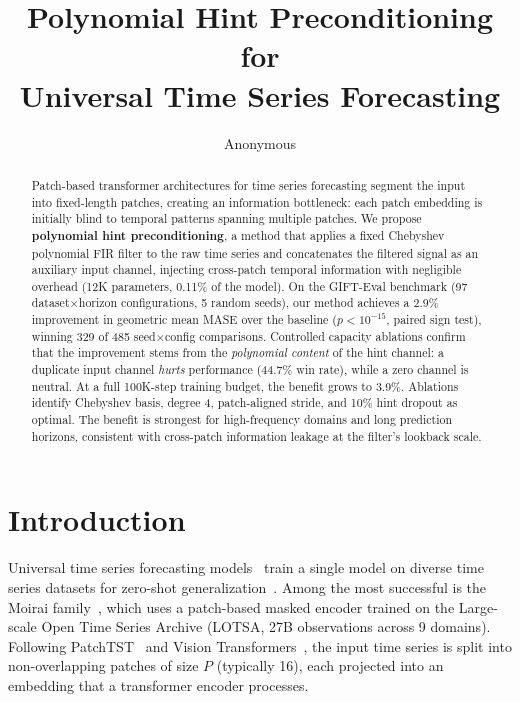 \documentclass{article}
\title{Polynomial Hint Preconditioning for\\Universal Time Series Forecasting}
\author{
  Anonymous
}
\begin{document}
\maketitle

\begin{abstract}
Patch-based transformer architectures for time series forecasting segment the input into fixed-length patches, creating an information bottleneck: each patch embedding is initially blind to temporal patterns spanning multiple patches. We propose \textbf{polynomial hint preconditioning}, a method that applies a fixed Chebyshev polynomial FIR filter to the raw time series and concatenates the filtered signal as an auxiliary input channel, injecting cross-patch temporal information with negligible overhead (12K parameters, 0.11\% of the model). On the GIFT-Eval benchmark (97 dataset$\times$horizon configurations, 5 random seeds), our method achieves a 2.9\% improvement in geometric mean MASE over the baseline ($p < 10^{-15}$, paired sign test), winning 329 of 485 seed$\times$config comparisons. Controlled capacity ablations confirm that the improvement stems from the \emph{polynomial content} of the hint channel: a duplicate input channel \emph{hurts} performance (44.7\% win rate), while a zero channel is neutral. At a full 100K-step training budget, the benefit grows to 3.9\%. Ablations identify Chebyshev basis, degree 4, patch-aligned stride, and 10\% hint dropout as optimal. The benefit is strongest for high-frequency domains and long prediction horizons, consistent with cross-patch information leakage at the filter's lookback scale.
\end{abstract}

\section{Introduction}

Universal time series forecasting models~\citep{woo2024unified,das2024decoder,ansari2024chronos,rasul2024lagllama,goswami2024moment,garza2024timegpt} train a single model on diverse time series datasets for zero-shot generalization~\citep{bommasani2021opportunities,liang2024foundation}. Among the most successful is the Moirai family~\citep{woo2024unified,liu2024moirai2}, which uses a patch-based masked encoder trained on the Large-scale Open Time Series Archive (LOTSA, 27B observations across 9 domains). Following PatchTST~\citep{nie2023patchtst} and Vision Transformers~\citep{dosovitskiy2021image}, the input time series is split into non-overlapping patches of size $P$ (typically 16), each projected into an embedding that a transformer encoder processes.
\end{document}
